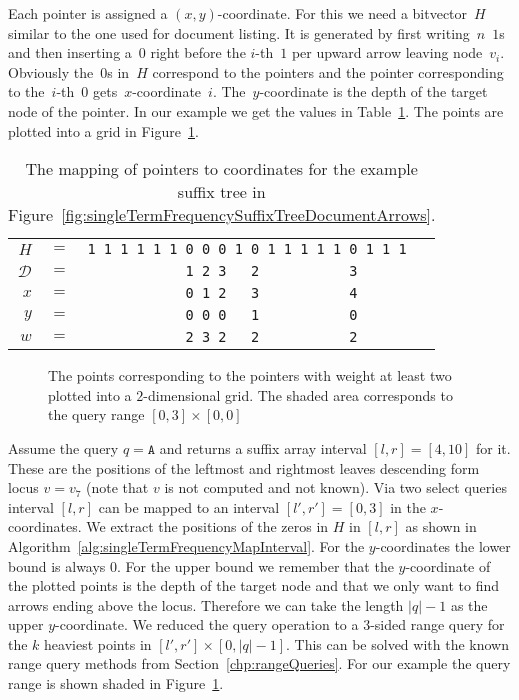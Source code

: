 \begin{Proof}
  Each pointer is assigned a $(x,y)$-coordinate. For this we need a bitvector~$H$ similar to the one used for document listing. It is generated by first writing~$n$~$1$s and then inserting a~$0$ right before the $i$-th~$1$ per upward arrow leaving node~$v_i$. Obviously the~$0$s in~$H$ correspond to the pointers and the pointer corresponding to the~$i$-th~$0$ gets~$x$-coordinate~$i$. The~$y$-coordinate is the depth of the target node of the pointer. In our example we get the values in Table~\ref{tbl:topKPointerCoordinates}. The points are plotted into a grid in Figure~\ref{fig:singleTermFrequencyPlot}.
  \begin{table}[htb]
    \centering
    \begin{tabular}{rcl}
      $H$           & $=$ & \texttt{1~1~1~1~1~1~0~0~0~1~0~1~1~1~1~1~0~1~1~1} \\
      $\mathcal{D}$ & $=$ & \texttt{~~~~~~~~~~~~1~2~3~~~2~~~~~~~~~~~3} \\
      $x$           & $=$ & \texttt{~~~~~~~~~~~~0~1~2~~~3~~~~~~~~~~~4} \\
      $y$           & $=$ & \texttt{~~~~~~~~~~~~0~0~0~~~1~~~~~~~~~~~0} \\
      $w$           & $=$ & \texttt{~~~~~~~~~~~~2~3~2~~~2~~~~~~~~~~~2}
    \end{tabular}
    \caption{The mapping of pointers to coordinates for the example suffix tree in Figure~\ref{fig:singleTermFrequencySuffixTreeDocumentArrows}.}
    \label{tbl:topKPointerCoordinates}
  \end{table}

  \begin{figure}[htb]
    \centering
    
    \caption{The points corresponding to the pointers with weight at least two plotted into a $2$-dimensional grid. The shaded area corresponds to the query range $[0, 3] \times [0, 0]$}
    \label{fig:singleTermFrequencyPlot}
  \end{figure}

  Assume the query $q = \texttt{A}$ and  returns a suffix array interval $[l,r] = [4,10]$ for it. These are the positions of the leftmost and rightmost leaves descending form locus $v = v_7$ (note that $v$ is not computed and not known). Via two select queries interval $[l,r]$ can be mapped to an interval $[l',r'] = [0,3]$ in the $x$-coordinates. We extract the positions of the zeros in $H$ in $[l,r]$ as shown in Algorithm~\ref{alg:singleTermFrequencyMapInterval}. For the $y$-coordinates the lower bound is always $0$. For the upper bound we remember that the $y$-coordinate of the plotted points is the depth of the target node and that we only want to find arrows ending above the locus. Therefore we can take the length $\vert q \vert - 1$ as the upper $y$-coordinate. We reduced the query operation to a $3$-sided range query for the $k$ heaviest points in $[l', r'] \times [0, \vert q \vert - 1]$. This can be solved with the known range query methods from Section~\ref{chp:rangeQueries}. For our example the query range is shown shaded in Figure~\ref{fig:singleTermFrequencyPlot}.


\end{Proof}
